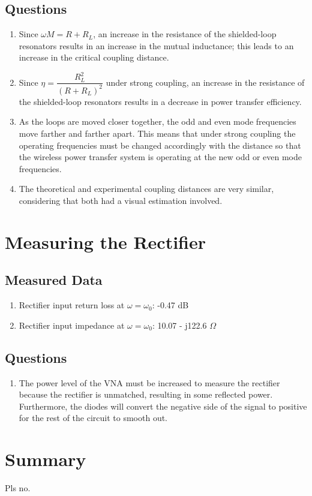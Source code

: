 \documentclass{article}
\begin{document}
\subsection{Questions}

\begin{enumerate}
	\item Since $\omega M = R + R_L$, an increase in the resistance of the shielded-loop resonators results in an increase in the mutual inductance; this leads to an increase in the critical coupling distance.
	\item Since $\eta = \dfrac{R_L^2}{(R+R_L)^2}$ under strong coupling, an increase in the resistance of the shielded-loop resonators results in a decrease in power transfer efficiency.
	\item As the loops are moved closer together, the odd and even mode frequencies move farther and farther apart. This means that under strong coupling the operating frequencies must be changed accordingly with the distance so that the wireless power transfer system is operating at the new odd or even mode frequencies.
	\item The theoretical and experimental coupling distances are very similar, considering that both had a visual estimation involved.
\end{enumerate}


\section{Measuring the Rectifier}

\subsection{Measured Data}

\begin{enumerate}
	\item Rectifier input return loss at $\omega = \omega_0$: -0.47 dB
	\item Rectifier input impedance at $\omega = \omega_0$: 10.07 - j122.6 $\Omega$
\end{enumerate}

\subsection{Questions}

\begin{enumerate}
	\item The power level of the VNA must be increased to measure the rectifier because the rectifier is unmatched, resulting in some reflected power. Furthermore, the diodes will convert the negative side of the signal to positive for the rest of the circuit to smooth out.
\end{enumerate}

\section{Summary}
Pls no.
\end{document}
